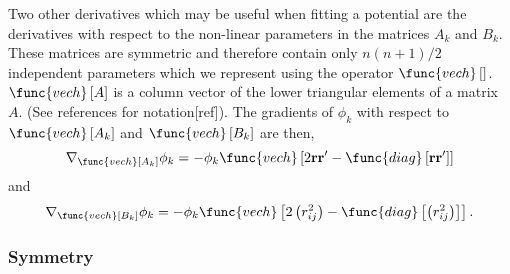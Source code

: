\documentclass[12pt,thmsa]{article}
\begin{document}
Two other derivatives which may be useful when fitting a potential are the
derivatives with respect to the non-linear parameters in the matrices $A_k$
and $B_k$. These matrices are symmetric and therefore contain only $n\left(
n+1\right) /2$ independent parameters which we represent using the operator $%
\func{vech}\left[ {}\right] $. $\func{vech}\left[ A\right] $ is a column
vector of the lower triangular elements of a matrix $A.$ (See references for
notation[ref]). The gradients of $\phi _k$ with respect to $\func{vech}%
\left[ A_k\right] $ and $\func{vech}\left[ B_k\right] $ are then, 
\begin{equation}
\nabla _{\func{vech}\left[ A_k\right] }\phi _k=-\phi _k\func{vech}\left[ 2%
\mathbf{rr}^{\prime }-\func{diag}\left[ \mathbf{rr}^{\prime }\right] \right]
\end{equation}
and 
\begin{equation}
\nabla _{\func{vech}\left[ B_k\right] }\phi _k=-\phi _k\func{vech}\left[
2\left( r_{ij}^2\right) -\func{diag}\left[ \left( r_{ij}^2\right) \right]
\right] .
\end{equation}

\subsubsection{Symmetry}
\end{document}
